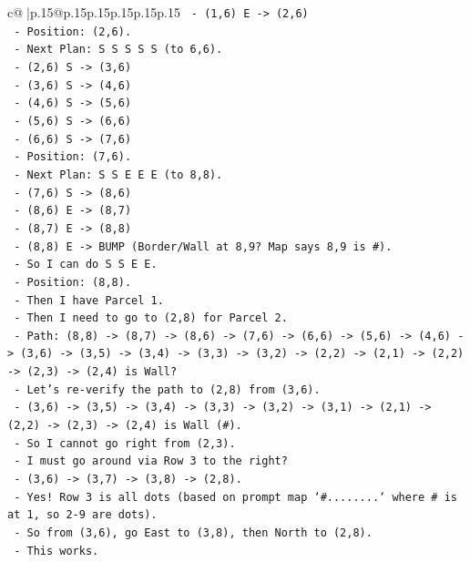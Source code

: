 \documentclass{article}
\begin{document}
{\begin{supertabular}{c@{$\;$}|p{.15\linewidth}@{}p{.15\linewidth}p{.15\linewidth}p{.15\linewidth}p{.15\linewidth}p{.15\linewidth}}
{{{\texttt{   {-} (1,6) E {-}> (2,6)} \\
\texttt{   {-} Position: (2,6).} \\
\texttt{   {-} Next Plan: S S S S S (to 6,6).} \\
\texttt{   {-} (2,6) S {-}> (3,6)} \\
\texttt{   {-} (3,6) S {-}> (4,6)} \\
\texttt{   {-} (4,6) S {-}> (5,6)} \\
\texttt{   {-} (5,6) S {-}> (6,6)} \\
\texttt{   {-} (6,6) S {-}> (7,6)} \\
\texttt{   {-} Position: (7,6).} \\
\texttt{   {-} Next Plan: S S E E E (to 8,8).} \\
\texttt{   {-} (7,6) S {-}> (8,6)} \\
\texttt{   {-} (8,6) E {-}> (8,7)} \\
\texttt{   {-} (8,7) E {-}> (8,8)} \\
\texttt{   {-} (8,8) E {-}> BUMP (Border/Wall at 8,9? Map says 8,9 is \#).} \\
\texttt{   {-} So I can do S S E E.} \\
\texttt{   {-} Position: (8,8).} \\
\texttt{   {-} Then I have Parcel 1.} \\
\texttt{   {-} Then I need to go to (2,8) for Parcel 2.} \\
\texttt{   {-} Path: (8,8) {-}> (8,7) {-}> (8,6) {-}> (7,6) {-}> (6,6) {-}> (5,6) {-}> (4,6) {-}> (3,6) {-}> (3,5) {-}> (3,4) {-}> (3,3) {-}> (3,2) {-}> (2,2) {-}> (2,1) {-}> (2,2) {-}> (2,3) {-}> (2,4) is Wall?} \\
\texttt{   {-} Let's re{-}verify the path to (2,8) from (3,6).} \\
\texttt{   {-} (3,6) {-}> (3,5) {-}> (3,4) {-}> (3,3) {-}> (3,2) {-}> (3,1) {-}> (2,1) {-}> (2,2) {-}> (2,3) {-}> (2,4) is Wall (\#).} \\
\texttt{   {-} So I cannot go right from (2,3).} \\
\texttt{   {-} I must go around via Row 3 to the right?} \\
\texttt{   {-} (3,6) {-}> (3,7) {-}> (3,8) {-}> (2,8).} \\
\texttt{   {-} Yes! Row 3 is all dots (based on prompt map `\#........` where \# is at 1, so 2{-}9 are dots).} \\
\texttt{   {-} So from (3,6), go East to (3,8), then North to (2,8).} \\
\texttt{   {-} This works.} \\
}}}
\end{supertabular}}
\end{document}
